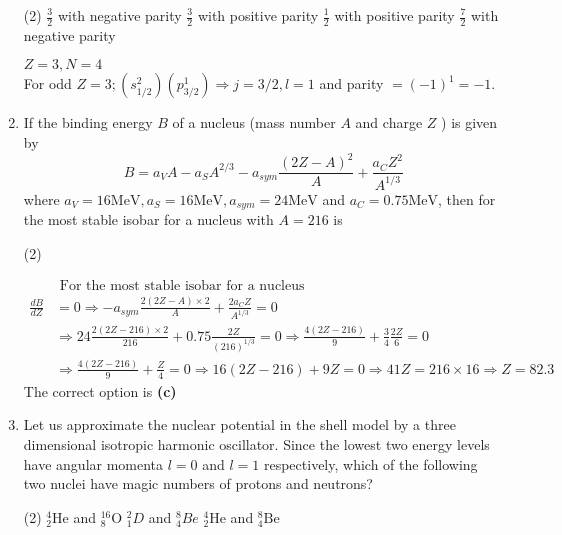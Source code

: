\begin{enumerate}
{}
\begin{tasks}(2)
	\task[\textbf{A.}] $\frac{3}{2}$ with negative parity
	\task[\textbf{B.}] $\frac{3}{2}$ with positive parity
	\task[\textbf{C.}]$\frac{1}{2}$ with positive parity
	\task[\textbf{D.}]$\frac{7}{2}$ with negative parity
\end{tasks}
\begin{answer}
 $Z=3, N=4$\\
	For odd $Z=3 ;\left(s_{1 / 2}^{2}\right)\left(p_{3 / 2}^{1}\right) \Rightarrow j=3 / 2, l=1$ and parity $=(-1)^{1}=-1$.
\end{answer}
\item If the binding energy $B$ of a nucleus (mass number $A$ and charge $Z$ ) is given by
$$
B=a_{V} A-a_{S} A^{2 / 3}-a_{s y m} \frac{(2 Z-A)^{2}}{A}+\frac{a_{C} Z^{2}}{A^{1 / 3}}
$$
where $a_{V}=16 \mathrm{MeV}, a_{S}=16 \mathrm{MeV}, a_{s y m}=24 \mathrm{MeV}$ and $a_{C}=0.75 \mathrm{MeV}$, then for the most stable isobar for a nucleus with $A=216$ is
{}
\begin{tasks}(2)
\end{tasks}
\begin{answer}
	\begin{align*}
	&\text { For the most stable isobar for a nucleus }\\
	\frac{d B}{d Z}&=0 \Rightarrow-a_{s y m} \frac{2(2 Z-A) \times 2}{A}+\frac{2 a_{C} Z}{A^{1 / 3}}=0\\
	&\Rightarrow 24 \frac{2(2 Z-216) \times 2}{216}+0.75 \frac{2 Z}{(216)^{1 / 3}}=0 \Rightarrow \frac{4(2 Z-216)}{9}+\frac{3}{4} \frac{2 Z}{6}=0\\
	&\Rightarrow \frac{4(2 Z-216)}{9}+\frac{Z}{4}=0 \Rightarrow 16(2 Z-216)+9 Z=0 \Rightarrow 41 Z=216 \times 16 \Rightarrow Z=82.3
	\end{align*}
	The correct option is \textbf{(c)}
\end{answer}
\item Let us approximate the nuclear potential in the shell model by a three dimensional isotropic harmonic oscillator. Since the lowest two energy levels have angular momenta $l=0$ and $l=1$ respectively, which of the following two nuclei have magic numbers of protons and neutrons?
{}
\begin{tasks}(2)
	\task[\textbf{A.}] ${ }_{2}^{4} \mathrm{He}$ and ${ }_{8}^{16} \mathrm{O}$
	\task[\textbf{B.}]${ }_{1}^{2} D$ and ${ }_{4}^{8} B e$
	\task[\textbf{C.}]${ }_{2}^{4} \mathrm{He}$ and ${ }_{4}^{8} \mathrm{Be}$

\end{tasks}
\end{enumerate}
